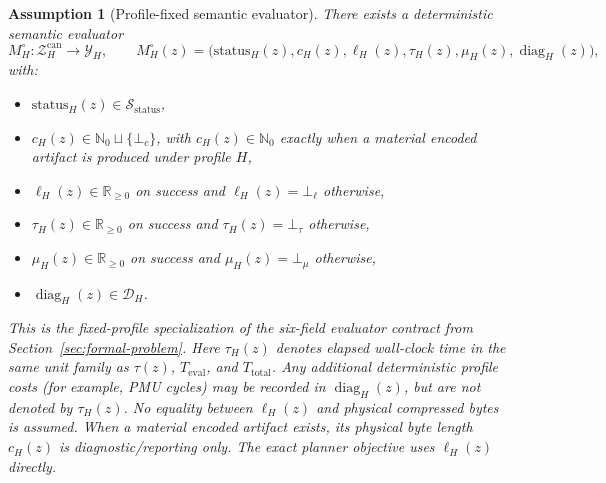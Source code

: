 \documentclass[11pt]{article}
\newtheorem{assumption}{Assumption}
\begin{document}
\begin{assumption}[Profile-fixed semantic evaluator]\label{ass:det-eval}
There exists a deterministic semantic evaluator
\[
M_H^\circ:\mathcal{Z}_H^{\mathrm{can}}\to\mathcal{Y}_H,
\qquad
M_H^\circ(z)=\big(\mathrm{status}_H(z),c_H(z),\ell_H(z),\tau_H(z),\mu_H(z),\operatorname{diag}_H(z)\big),
\]
with:
\begin{itemize}
    \item $\mathrm{status}_H(z)\in\mathcal{S}_{\mathrm{status}}$,
    \item $c_H(z)\in\mathbb{N}_0\sqcup\{\bot_c\}$, with $c_H(z)\in\mathbb{N}_0$
    exactly when a material encoded artifact is produced under profile $H$,
    \item $\ell_H(z)\in\mathbb{R}_{\ge 0}$ on success and
    $\ell_H(z)=\bot_\ell$ otherwise,
    \item $\tau_H(z)\in\mathbb{R}_{\ge 0}$ on success and
    $\tau_H(z)=\bot_\tau$ otherwise,
    \item $\mu_H(z)\in\mathbb{R}_{\ge 0}$ on success and
    $\mu_H(z)=\bot_\mu$ otherwise,
    \item $\operatorname{diag}_H(z)\in\mathcal{D}_H$.
\end{itemize}
This is the fixed-profile specialization of the six-field evaluator contract
from Section~\ref{sec:formal-problem}. Here $\tau_H(z)$ denotes elapsed
wall-clock time in the same unit family as $\tau(z)$, $T_{\mathrm{eval}}$,
and $T_{\mathrm{total}}$. Any additional deterministic profile costs (for
example, PMU cycles) may be recorded in $\operatorname{diag}_H(z)$, but are
not denoted by $\tau_H(z)$. No equality between $\ell_H(z)$ and physical
compressed bytes is assumed. When a material encoded artifact exists, its
physical byte length $c_H(z)$ is diagnostic/reporting only. The exact planner
objective uses $\ell_H(z)$ directly.
\end{assumption}
\end{document}

